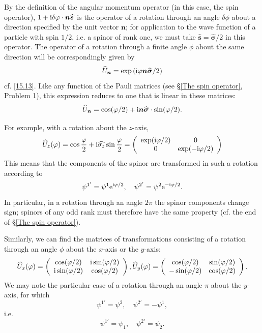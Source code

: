 By the definition of the angular momentum operator (in this case, the spin operator), $ 1 + \mathrm{i} \delta\varphi\cdot\bm{n}\widehat{\bm{s}} $ is the operator of a rotation through an angle $ \delta\phi $ about a direction specified by the unit vector $ \bm{n} $; for application to the wave function of a particle with spin $ 1/2 $, i.e. a spinor of rank one, we must take $ \hat{\bm{s}}=\hat{\bm{\sigma}}/2 $ in this operator. The operator of a rotation through a finite angle $\phi$ about the same direction will be correspondingly given by
\begin{equation}\label{58.1}
\widehat{U}_{\bm{n}}=\exp\left(\mathrm{i}\varphi\bm{n}\widehat{\bm{\sigma}}/2 \right)
\end{equation}
cf. \eqref{15.13}. Like any function of the Pauli matrices (see \S\ref{The spin operator}, Problem 1), this expression reduces to one that is linear in these matrices:
\begin{equation}\label{58.2}
\widehat{U}_{\bm{n}}=\cos(\varphi/2)+\mathrm{i}\bm{n}\widehat{\bm{\sigma}}\cdot\sin(\varphi/2).
\end{equation}


For example, with a rotation about the $ z $-axis,
\begin{equation}\label{58.3}
\widehat{U}_z(\varphi)=\cos\frac{\varphi}{2}+\mathrm{i}\widehat{\sigma_z}\sin\frac{\varphi}{2}=\left(\begin{array}{cc}
\exp(\mathrm{i}\varphi/2)&0\\
0&\exp(-\mathrm{i}\varphi/2)
\end{array} \right)
\end{equation}
This means that the components of the spinor are transformed in such a rotation according to
\[ \psi^{1'}=\psi^1\mathrm{e}^{\mathrm{i}\varphi/2},\quad\psi^{2'}=\psi^2\mathrm{e}^{-\mathrm{i}\varphi/2} .\]
In particular, in a rotation through an angle $ 2\pi $ the spinor components change sign; spinors of any odd rank must therefore have the same property (cf. the end of \S\ref{The spin operator}).

Similarly, we can find the matrices of transformations consisting of a rotation through an angle $\phi$ about the $ x $-axis or the $ y $-axis:
\begin{equation}\label{58.4}
\widehat{U}_x(\varphi)=\left(\begin{array}{cc}
\cos(\varphi/2)&\mathrm{i}\sin(\varphi/2)\\
\mathrm{i}\sin(\varphi/2)&\cos(\varphi/2)
\end{array}\right),\widehat{U}_y(\varphi)=\left( \begin{array}{cc}
\cos(\varphi/2)&\sin(\varphi/2)\\
-\sin(\varphi/2)&\cos(\varphi/2)
\end{array}\right).
\end{equation}
We may note the particular case of a rotation through an angle $ \pi $ about the $ y $-axis, for which
\[ \psi^{1'}=\psi^2,\quad\psi^{2'}=-\psi^1, \]
i.e.
\begin{equation}\label{58.5}
\psi^{1'}=\psi_1,\quad\psi^{2'}=\psi_2.
\end{equation}


